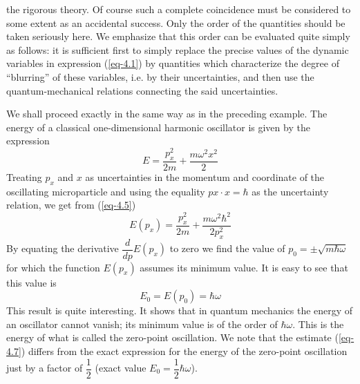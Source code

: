\documentclass[a4paper,sfsidenotes,colorlinks=true]{tufte-book}
\numberwithin{equation}{section}
\numberwithin{figure}{section}
\begin{document}
the rigorous theory. Of
course such a complete coincidence must be considered to some extent
as an accidental success. Only the order of the quantities should be
taken seriously here. We emphasize that this order can be evaluated
quite simply as follows: it is sufficient first to simply replace the
precise values of the dynamic variables in expression (\ref{eq-4.1})
by quantities which characterize the degree of ``blurring'' of these
variables, i.e. by their uncertainties, and then use the
quantum-mechanical relations connecting the said uncertainties.

We  shall proceed exactly in the same way as in the preceding
example. The energy of a classical one-dimensional harmonic
oscillator is given by the expression
\begin{equation}%
E = \frac{p^{2}_{x}}{2m} + \frac{m \omega^{2}x^{2}}{2}
\label{eq-4.5} 
\end{equation}
Treating $p_{x}$ and $x$ as uncertainties in the momentum and coordinate of
the oscillating microparticle and using the equality $px \cdot x = \hbar$ as the
uncertainty relation, we get from (\ref{eq-4.5}) 
\begin{equation}%
E (p_{x}) = \frac{p^{2}_{x}}{2m} + \frac{m \omega^{2}\hbar^{2}}{2p_{x}^{2}}
\label{eq-4.6} 
\end{equation}
By equating the derivative $\dfrac{d}{dp} E (p_{x})$ to zero we find
the value of $p_{0} = \pm \sqrt{m \hbar \omega }$ for which the
function $E(p_{x})$ assumes its minimum value. It is easy to see that
this value is 
\begin{equation}%
E_{0} = E(p_{0}) = \hbar \omega
\label{eq-4.7} 
\end{equation}
This result is quite interesting. It shows that in quantum mechanics
the energy of an oscillator cannot vanish; its minimum value is of the
order of $\hbar \omega$. This is the energy of what is called the zero-point
oscillation. We note that the estimate (\ref{eq-4.7}) differs from the exact
expression for the energy of the zero-point oscillation just by a
factor of $\dfrac{1}{2}$ (exact value $E_{0} = \dfrac{1}{2} \hbar
\omega$).  
\end{document}
